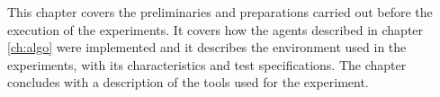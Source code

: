 This chapter covers the preliminaries and preparations carried out before the
execution of the experiments. It covers how the agents described in chapter
\ref{ch:algo} were implemented and it describes the environment used in the
experiments, with its characteristics and test specifications. The chapter
concludes with a description of the tools used for the experiment.
